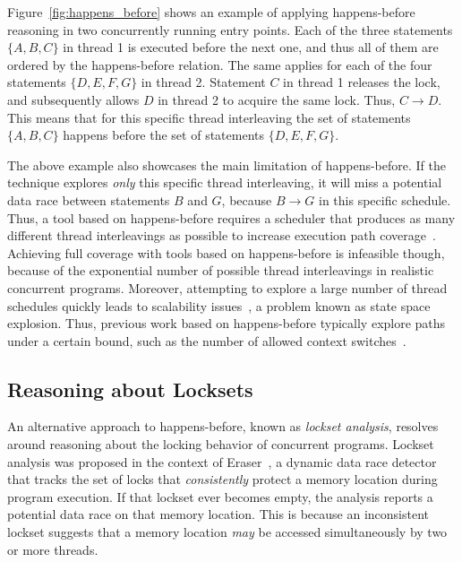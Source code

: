 Figure~\ref{fig:happens_before} shows an example of applying happens-before reasoning in two concurrently running entry points. Each of the three statements $\{A, B, C\}$ in thread 1 is executed before the next one, and thus all of them are ordered by the happens-before relation. The same applies for each of the four statements $\{D, E, F, G\}$ in thread 2. Statement $C$ in thread 1 releases the lock, and subsequently allows $D$ in thread 2 to acquire the same lock. Thus, $C \rightarrow D$. This means that for this specific thread interleaving the set of statements $\{A, B, C\}$ happens before the set of statements $\{D, E, F, G\}$.

The above example also showcases the main limitation of happens-before. If the technique explores \emph{only} this specific thread interleaving, it will miss a potential data race between statements $B$ and $G$, because $B \rightarrow G$ in this specific schedule. Thus, a tool based on happens-before requires a scheduler that produces as many different thread interleavings as possible to increase execution path coverage~\cite{savage1997eraser}. Achieving full coverage with tools based on happens-before is infeasible though, because of the exponential number of possible thread interleavings in realistic concurrent programs. Moreover, attempting to explore a large number of thread schedules quickly leads to scalability issues~\cite{musuvathi2008finding}, a problem known as state space explosion. Thus, previous work based on happens-before typically explore paths under a certain bound, such as the number of allowed context switches~\cite{qadeer2004kiss}.

\subsection{Reasoning about Locksets}
\label{bg:lockset}

An alternative approach to happens-before, known as \emph{lockset analysis}, resolves around reasoning about the locking behavior of concurrent programs. Lockset analysis was proposed in the context of Eraser~\cite{savage1997eraser}, a dynamic data race detector that tracks the set of locks that \emph{consistently} protect a memory location during program execution. If that lockset ever becomes empty, the analysis reports a potential data race on that memory location.  This is because an inconsistent lockset suggests that a memory location \emph{may} be accessed simultaneously by two or more threads.


